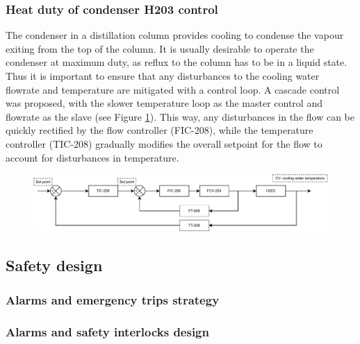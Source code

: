 \subsubsection{Heat duty of condenser H203 control}%
The condenser in a distillation column provides cooling to condense the vapour exiting from the top of the column. It is usually desirable to operate the condenser at maximum duty, as reflux to the column has to be in a liquid state. Thus it is important to ensure that any disturbances to the cooling water flowrate and temperature are mitigated with a control loop. A cascade control was proposed, with the slower temperature loop as the master control and flowrate as the slave (see Figure \ref{fig:S203C-TC}). This way, any disturbances in the flow can be quickly rectified by the flow controller (FIC-208), while the temperature controller (TIC-208) gradually modifies the overall setpoint for the flow to account for disturbances in temperature.

\begin{figure}[H]
    \centering
    \includegraphics[width=\linewidth]{chapters/4-operation-control/4-Figures/H203-TC.pdf}
    \caption{}
    \label{fig:S203C-TC}
\end{figure}



\subsection{Safety design}

\subsubsection{Alarms and emergency trips strategy}

\subsubsection{Alarms and safety interlocks design}
